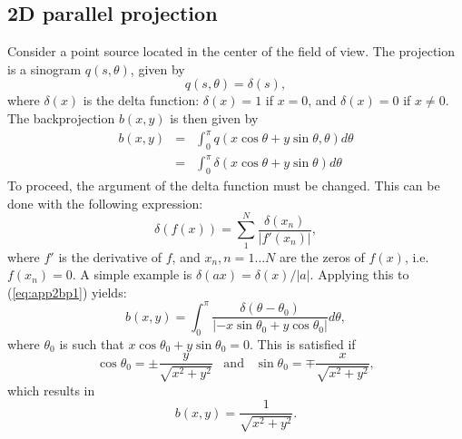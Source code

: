 \subsection{2D parallel projection}
Consider a point source located in the center of the field of view.
The projection is a sinogram $q(s, \theta)$, given by
\begin{equation}
  q(s, \theta) = \delta(s),
\end{equation}
where $\delta(x)$ is the delta function: $\delta(x) = 1$ if $x = 0$, and
$\delta(x) = 0$ if $x \neq 0$.
The backprojection $b(x,y)$ is then given by
\begin{align}
  b(x,y) & = & \int_0^\pi q(x \cos\theta + y\sin\theta, \theta)
                d\theta \nonumber\\
         & = & \int_0^\pi \delta(x\cos\theta + y\sin\theta) d\theta
                \label{eq:app2bp1}
\end{align}
To proceed, the argument of the delta function must be changed. This
can be done with the following expression:
\begin{equation}
  \delta(f(x)) = \sum_1^N \frac{\delta(x_n)}{|f'(x_n)|},
\end{equation}
where $f'$ is the derivative of $f$, and $x_n, n=1 \ldots N$ are the
zeros of $f(x)$, i.e. $f(x_n) = 0$. A simple example is $\delta(ax) =
\delta(x) / |a|$. Applying this to (\ref{eq:app2bp1}) yields:
\begin{equation}
 b(x,y)  =  \int_0^\pi \frac{\delta(\theta - \theta_0)}
                              {|-x\sin\theta_0 + y\cos\theta_0|} d\theta,
\end{equation}
where $\theta_0$ is such that $x\cos\theta_0 + y\sin\theta_0 =
0$. This is satisfied if
\begin{displaymath}
  \cos\theta_0 = \pm \frac{y}{\sqrt{x^2+y^2}} 
       \;\;\;\mbox{and}\;\;\;
  \sin\theta_0 = \mp \frac{x}{\sqrt{x^2+y^2}},
\end{displaymath}
which results in
\begin{equation}
  b(x,y) = \frac{1}{\sqrt{x^2 + y^2}}.
\end{equation}

